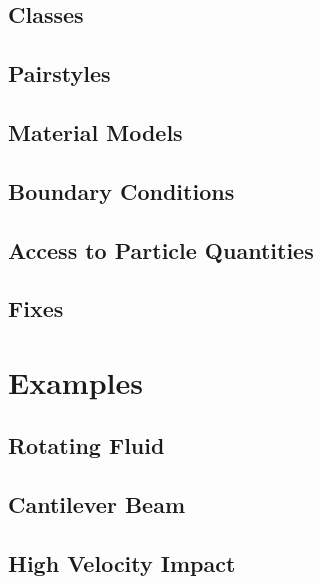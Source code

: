 \documentclass{article}
\begin{document}
		\subsection{Classes}
		
		
		
		
		\subsection{Pairstyles}
		
		
		\subsection{Material Models}
		
		
		
		\subsection{Boundary Conditions}
		
		
		\subsection{Access to Particle Quantities}
		
		
		\subsection{Fixes}





	
	
	
	
	
	
	\section{Examples}
	
		\subsection{Rotating Fluid}
		
		
		
		\subsection{Cantilever Beam}
		
		
		
		
		
		
		\subsection{High Velocity Impact}
\end{document}
